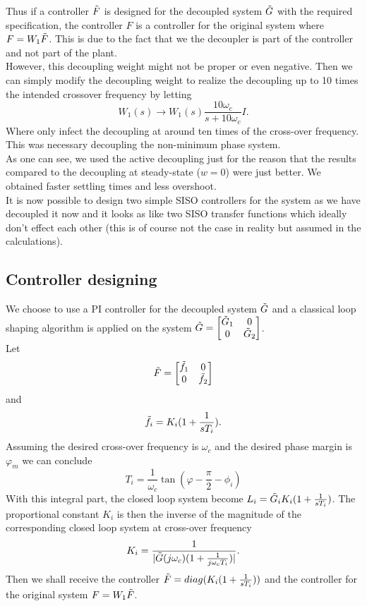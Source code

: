 \documentclass[a4paper,12pt,oneside,onecolumn]{article}
\begin{document}
Thus if a controller $\Tilde{F}$ is designed for the decoupled system $\Tilde{G}$ with the required specification, the controller $F$ is a controller for the original system where $F = W_1 \Tilde{F}$. This is due to the fact that we the decoupler is part of the controller and not part of the plant.\\
However, this decoupling weight might not be proper or even negative. Then we can simply modify the decoupling weight to realize the decoupling up to 10 times the intended crossover frequency by letting 
\begin{equation}
    W_1(s) \rightarrow W_1(s) \frac{10 \omega_c}{s + 10 \omega_c} I.
\end{equation}
Where only infect the decoupling at around ten times of the cross-over frequency. This was necessary decoupling the non-minimum phase system.\\
As one can see, we used the active decoupling just for the reason that the results compared to the decoupling at steady-state ($w=0$) were just better. We obtained faster settling times and less overshoot.\\
It is now possible to design two simple SISO controllers for the system as we have decoupled it now and it looks as like two SISO transfer functions which ideally don't effect each other (this is of course not the case in reality but assumed in the calculations).
\subsection{Controller designing}
We choose to use a PI controller for the decoupled system $\Tilde{G}$ and a classical loop shaping algorithm is applied on the system $\Tilde{G} = \begin{bmatrix} \Tilde{G}_{1} & 0 \\ 0 & \Tilde{G}_{2} \end{bmatrix}$.\\
Let 
\begin{align}
    \Tilde{F} = \begin{bmatrix} \Tilde{f}_1 & 0 \\ 0 & \Tilde{f}_2 \end{bmatrix}
\end{align}
and 
\begin{align}
    \Tilde{f}_i = K_i (1 + \frac{1}{sT_i}).
\end{align} 
Assuming the desired cross-over frequency is $\omega_c$ and the desired phase margin is $\varphi_m$ we can conclude
\begin{equation}
    T_i = \frac{1}{\omega_c} \tan{(\varphi-\frac{\pi}{2} - \phi_i)} 
\end{equation}
With this integral part, the closed loop system become $L_i = \Tilde{G}_i K_i (1 + \frac{1}{s T_i}) $. The proportional constant $K_i$ is then the inverse of the magnitude of the corresponding closed loop system at cross-over frequency
\begin{align}
    K_i = \frac{1}{|\Tilde{G}(j\omega_c)(1+\frac{1}{j\omega_c T_i})|}.
\end{align}
Then we shall receive the controller $\Tilde{F} = diag(K_i (1+\frac{1}{s T_i}))$ and the controller for the original system $F = W_1 \Tilde{F}$. 
\end{document}
